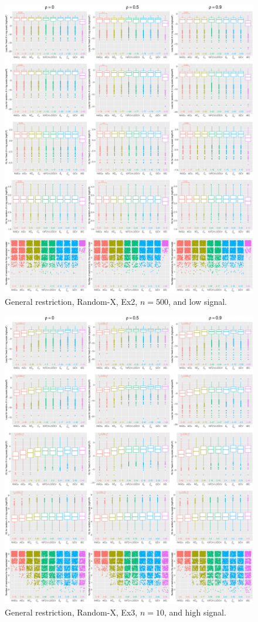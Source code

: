 \begin{figure}[!ht]
\centering
\includegraphics[width=\textwidth]{figures/supplement/randomx/general_restriction/Ex2_n500_lsnr.eps}
\caption{General restriction, Random-X, Ex2, $n=500$, and low signal.}
\end{figure}
\clearpage
\begin{figure}[!ht]
\centering
\includegraphics[width=\textwidth]{figures/supplement/randomx/general_restriction/Ex3_n10_hsnr.eps}
\caption{General restriction, Random-X, Ex3, $n=10$, and high signal.}
\end{figure}

